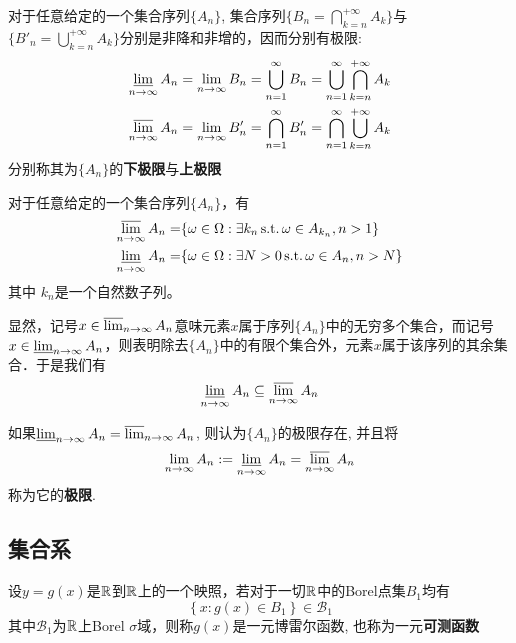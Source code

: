 \begin{definition}[上极限与下极限]
    对于任意给定的一个集合序列$\{ A_n \}$, 集合序列$\{B_n= \bigcap_{k=n}^{+\infty}A_k \}$与$\{B'_n=  \bigcup_{k=n}^{+\infty}A_k \}$分别是非降和非增的，因而分别有极限:
    \begin{align*}
        \varliminf_{n \to \infty}A_n =\lim_{n \to \infty} B_n = \bigcup_{n=1}^{\infty} B_n= \bigcup_{n=1}^{\infty} \bigcap_{k=n}^{+\infty}A_k \\
        \varlimsup_{n \to \infty}A_n =\lim_{n \to \infty} B'_n = \bigcap_{n=1}^{\infty} B'_n= \bigcap_{n=1}^{\infty} \bigcup_{k=n}^{+\infty}A_k
    \end{align*}
    分别称其为$\{ A_n \}$的\textbf{下极限}与\textbf{上极限}
\end{definition}

\begin{proposition}
    对于任意给定的一个集合序列$\{ A_n \}$，有
    \begin{align*}
        \varlimsup_{n \to \infty}A_n =& \{ \omega \in \Omega : \exists k_n \, \mathrm{s.t.}\, \omega \in A_{k_n}, n>1 \}  \\
        \varliminf_{n \to \infty}A_n =& \{ \omega \in \Omega : \exists N>0 \, \mathrm{s.t.}\, \omega \in A_n, n>N \}
    \end{align*}
    其中 $k_n$是一个自然数子列。
\end{proposition}

显然，记号$x \in \varlimsup_{n \to \infty}A_n $意味元素$x$属于序列$\{ A_n \}$中的无穷多个集合，而记号$x \in \varliminf_{n \to \infty}A_n $，则表明除去$\{ A_n \}$中的有限个集合外，元素$x$属于该序列的其余集合．于是我们有
\[ \varliminf_{n \to \infty}A_n \subseteq  \varlimsup_{n \to \infty}A_n \]

\begin{definition}
    如果$\varliminf_{n \to \infty}A_n = \varlimsup_{n \to \infty}A_n$, 则认为$\{ A_n \}$的极限存在, 并且将
    \[ \lim_{n \to \infty}A_n := \varliminf_{n \to \infty}A_n = \varlimsup_{n \to \infty}A_n \]
    称为它的\textbf{极限}.
\end{definition}

\subsection{集合系}

\begin{definition}[可测函数]
    设$y =g(x)$是$\mathbb{R}$到$\mathbb{R}$上的一个映照，若对于一切$\mathbb{R}$中的Borel点集$B_1$均有
    \[\left\{ x:g(x) \in B_1 \right\} \in \mathcal{B}_1 \]
    其中$\mathcal{B}_1$为$\mathbb{R}$上Borel $\sigma$域，则称$g(x)$是一元博雷尔函数, 也称为一元\textbf{可测函数}
\end{definition}

